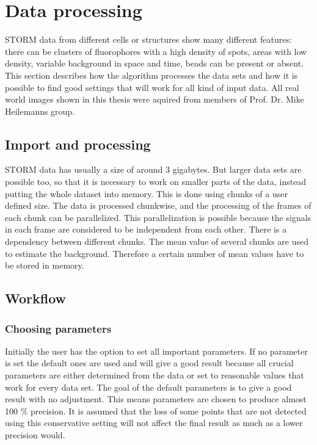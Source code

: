 \chapter{Data processing}
STORM data from different cells or structures show many different features: there can be clusters of fluorophores with a high density of spots, areas with low density, variable background in space and time, beads can be present or absent.\newline
This section describes how the algorithm processes the data sets and how it is possible to find good settings that will work for all kind of input data.\newline
All real world images shown in this thesis were aquired from members of Prof. Dr. Mike Heilemanns group.


\section*{Import and processing}
STORM data has usually a size of around 3 gigabytes. But larger data sets are possible too, so that it is necessary to work on smaller parts of the data, instead putting the whole dataset into memory. This is done using chunks of a user defined size. The data is processed chunkwise, and the processing of the frames of each chunk can be parallelized. This parallelization is possible because the signals in each frame are considered to be independent from each other. There is a dependency between different chunks. The mean value of several chunks are used to estimate the background. Therefore a certain number of mean values have to be stored in memory.

\section{Workflow}
\subsection{Choosing parameters}
Initially the user has the option to set all important parameters. If no parameter is set the default ones are used and will give a good result because all crucial parameters are either determined from the data or set to reasonable values that work for every data set. The goal of the default parameters is to give a good result with no adjustment. This means parameters are chosen to produce almost 100 \% precision. It is assumed that the loss of some points that are not detected using this conservative setting will not affect the final result as much as a lower precision would.

